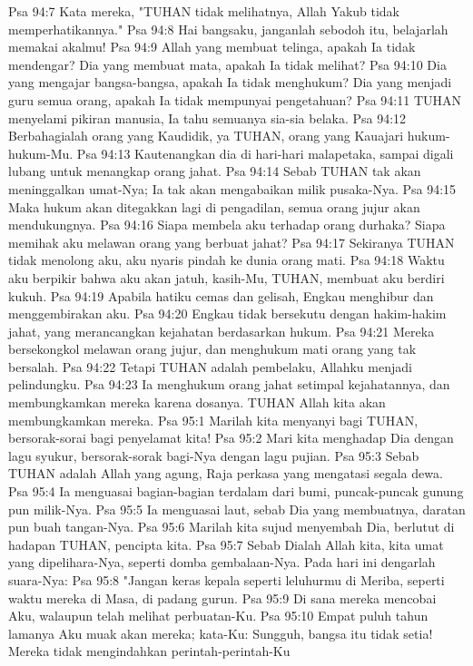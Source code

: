 Psa 94:7  Kata mereka, "TUHAN tidak melihatnya, Allah Yakub tidak memperhatikannya."
Psa 94:8  Hai bangsaku, janganlah sebodoh itu, belajarlah memakai akalmu!
Psa 94:9  Allah yang membuat telinga, apakah Ia tidak mendengar? Dia yang membuat mata, apakah Ia tidak melihat?
Psa 94:10  Dia yang mengajar bangsa-bangsa, apakah Ia tidak menghukum? Dia yang menjadi guru semua orang, apakah Ia tidak mempunyai pengetahuan?
Psa 94:11  TUHAN menyelami pikiran manusia, Ia tahu semuanya sia-sia belaka.
Psa 94:12  Berbahagialah orang yang Kaudidik, ya TUHAN, orang yang Kauajari hukum-hukum-Mu.
Psa 94:13  Kautenangkan dia di hari-hari malapetaka, sampai digali lubang untuk menangkap orang jahat.
Psa 94:14  Sebab TUHAN tak akan meninggalkan umat-Nya; Ia tak akan mengabaikan milik pusaka-Nya.
Psa 94:15  Maka hukum akan ditegakkan lagi di pengadilan, semua orang jujur akan mendukungnya.
Psa 94:16  Siapa membela aku terhadap orang durhaka? Siapa memihak aku melawan orang yang berbuat jahat?
Psa 94:17  Sekiranya TUHAN tidak menolong aku, aku nyaris pindah ke dunia orang mati.
Psa 94:18  Waktu aku berpikir bahwa aku akan jatuh, kasih-Mu, TUHAN, membuat aku berdiri kukuh.
Psa 94:19  Apabila hatiku cemas dan gelisah, Engkau menghibur dan menggembirakan aku.
Psa 94:20  Engkau tidak bersekutu dengan hakim-hakim jahat, yang merancangkan kejahatan berdasarkan hukum.
Psa 94:21  Mereka bersekongkol melawan orang jujur, dan menghukum mati orang yang tak bersalah.
Psa 94:22  Tetapi TUHAN adalah pembelaku, Allahku menjadi pelindungku.
Psa 94:23  Ia menghukum orang jahat setimpal kejahatannya, dan membungkamkan mereka karena dosanya. TUHAN Allah kita akan membungkamkan mereka.
Psa 95:1  Marilah kita menyanyi bagi TUHAN, bersorak-sorai bagi penyelamat kita!
Psa 95:2  Mari kita menghadap Dia dengan lagu syukur, bersorak-sorak bagi-Nya dengan lagu pujian.
Psa 95:3  Sebab TUHAN adalah Allah yang agung, Raja perkasa yang mengatasi segala dewa.
Psa 95:4  Ia menguasai bagian-bagian terdalam dari bumi, puncak-puncak gunung pun milik-Nya.
Psa 95:5  Ia menguasai laut, sebab Dia yang membuatnya, daratan pun buah tangan-Nya.
Psa 95:6  Marilah kita sujud menyembah Dia, berlutut di hadapan TUHAN, pencipta kita.
Psa 95:7  Sebab Dialah Allah kita, kita umat yang dipelihara-Nya, seperti domba gembalaan-Nya. Pada hari ini dengarlah suara-Nya:
Psa 95:8  "Jangan keras kepala seperti leluhurmu di Meriba, seperti waktu mereka di Masa, di padang gurun.
Psa 95:9  Di sana mereka mencobai Aku, walaupun telah melihat perbuatan-Ku.
Psa 95:10  Empat puluh tahun lamanya Aku muak akan mereka; kata-Ku: Sungguh, bangsa itu tidak setia! Mereka tidak mengindahkan perintah-perintah-Ku
